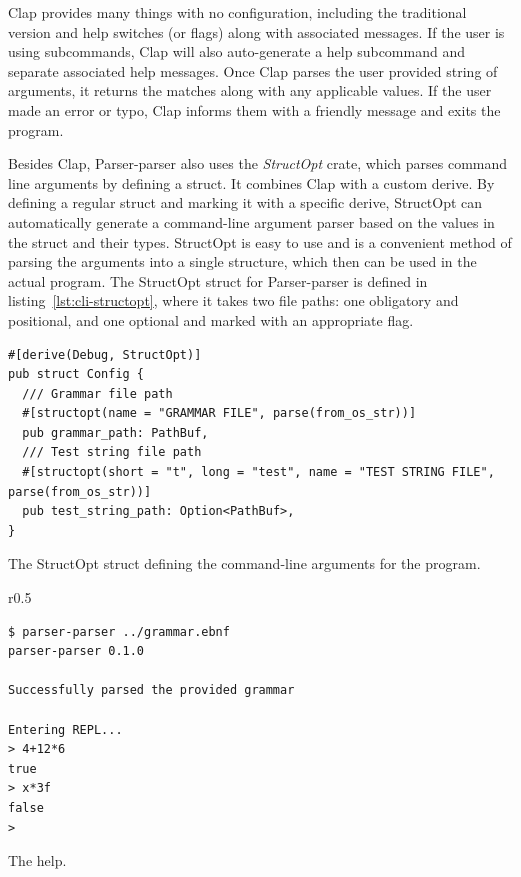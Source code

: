 \documentclass[english,engineering]{wizthesis}
\newcommand{\thisproject}{Parser-parser}
\begin{document}
Clap provides many things with no configuration, including the traditional
version and help switches (or flags) along with associated messages. If the user
is using subcommands, Clap will also auto-generate a help subcommand and
separate associated help messages. Once Clap parses the user provided string of
arguments, it returns the matches along with any applicable values. If the user
made an error or typo, Clap informs them with a friendly message and exits
the program.

Besides Clap, \thisproject{} also uses the \emph{StructOpt} crate, which parses
command line arguments by defining a struct. It combines Clap with a custom
derive. By defining a regular struct and marking it with a specific derive,
StructOpt can automatically generate a command-line argument parser based on the
values in the struct and their types. StructOpt is easy to use and is a
convenient method of parsing the arguments into a single structure, which then
can be used in the actual program. The StructOpt struct for \thisproject{} is
defined in listing~\ref{lst:cli-structopt}, where it takes two file paths: one
obligatory and positional, and one optional and marked with an appropriate flag.

\begin{listing}[H]
  \begin{verbatim}
#[derive(Debug, StructOpt)]
pub struct Config {
  /// Grammar file path
  #[structopt(name = "GRAMMAR FILE", parse(from_os_str))]
  pub grammar_path: PathBuf,
  /// Test string file path
  #[structopt(short = "t", long = "test", name = "TEST STRING FILE", parse(from_os_str))]
  pub test_string_path: Option<PathBuf>,
}
  \end{verbatim}
  \caption{The StructOpt struct defining the command-line arguments for the
  program.}
  \label{lst:cli-structopt}
\end{listing}

\begin{wraplisting}{r}{0.5\textwidth}
  \begin{verbatim}
$ parser-parser ../grammar.ebnf
parser-parser 0.1.0

Successfully parsed the provided grammar

Entering REPL...
> 4+12*6
true
> x*3f
false
>
  \end{verbatim}
  \caption{The help.}
  \label{lst:cli-help}
\end{wraplisting}
\end{document}
